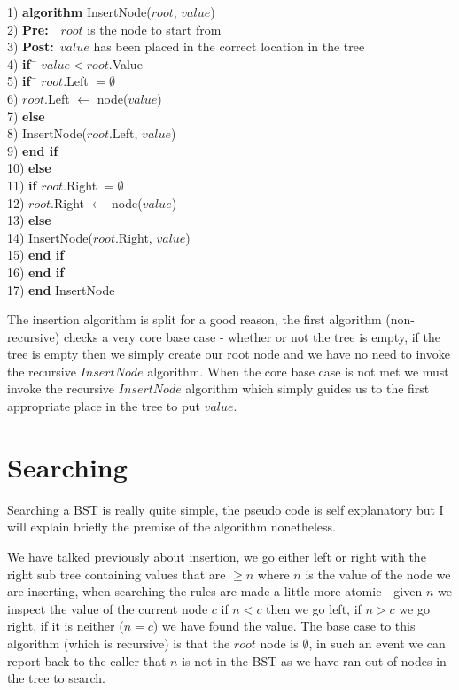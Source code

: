 \begin{tabbing}
1)  \textbf{alg}\= \textbf{orithm} InsertNode($root$, $value$) \\
2)  \> \textbf{Pre:}~~$root$ is the node to start from \\
3)  \> \textbf{Post:}~$value$ has been placed in the correct location in the tree \\
4)  \> \textbf{if}~\= $value < root$.Value \\
5)  \> \> \textbf{if}~\= $root$.Left $= \emptyset$ \\
6)  \> \> \> $root$.Left $\leftarrow$ node($value$) \\
7)  \> \> \textbf{else} \\
8)  \> \> \> InsertNode($root$.Left, $value$) \\
9)  \> \> \textbf{end if} \\
10) \> \textbf{else} \\
11) \> \> \textbf{if} $root$.Right $= \emptyset$ \\
12) \> \> \> $root$.Right $\leftarrow$ node($value$) \\
13) \> \> \textbf{else} \\
14) \> \> \> InsertNode($root$.Right, $value$) \\
15) \> \> \textbf{end if} \\
16) \> \textbf{end if} \\
17) \textbf{end} InsertNode \\ 
\end{tabbing}

The insertion algorithm is split for a good reason, the first algorithm (non-recursive) checks a very core base case - whether or not the tree is empty, if the tree is empty then we simply create our root node and we have no need to invoke the recursive $InsertNode$ algorithm. When the core base case is not met we must invoke the recursive $InsertNode$ algorithm which simply guides us to the first appropriate place in the tree to put $value$.

\section{Searching}
Searching a BST is really quite simple, the pseudo code is self explanatory but I will explain briefly the premise of the algorithm nonetheless.

We have talked previously about insertion, we go either left or right with the right sub tree containing values that are $\geq n$ where $n$ is the value of the node we are inserting, when searching the rules are made a little more atomic - given $n$ we inspect the value of the current node $c$ if $n < c$ then we go left, if $n >c$ we go right, if it is neither ($n = c$) we have found the value. The base case to this algorithm (which is recursive) is that the $root$ node is $\emptyset$, in such an event we can report back to the caller that $n$ is not in the BST as we have ran out of nodes in the tree to search.

